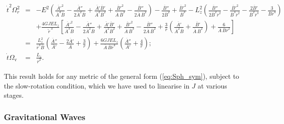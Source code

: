 \documentclass[aps,prd,amsfonts,amssymb,amsmath,nofootinbib,reprint,showpacs]{revtex4-1}
\newcommand{\eqnref}[1]{(\ref{eq:#1})}
\newcommand{\sub}[1]{\ensuremath{_\text{#1}}}
\begin{document}
\begin{widetext}
\begin{eqnarray}
\dot{t}^2\Omega^2_r & = & -E^2 \left( \frac{\overline{A}'^2}{\overline{A}^3 \overline{B}} - \frac{\overline{A}''}{2\overline{A}^2\overline{B}} + \frac{\overline{A}'\overline{B}'}{\overline{A}^2\overline{B}^2} + \frac{\overline{B}'^2}{\overline{A}\,\overline{B}^3} - \frac{\overline{B}''}{2\overline{A}\,\overline{B}^2} \right) - \frac{\overline{B}''}{2\overline{B}^2} +  \frac{\overline{B}'^2}{\overline{B}^3} - L_z^2 \left(\frac{\overline{B}''}{2\overline{B}^2 \overline{r}^2} - \frac{\overline{B}'^2}{\overline{B}^3 \overline{r}^2} - \frac{2\overline{B}'}{\overline{B}^2 \overline{r}^3}-\frac{3}{\overline{B} \overline{r}^4} \right) \nonumber\\
& & + \frac{4GJEL_z}{\widetilde{r}^{\,3}} \left[ \frac{\overline{A}'^2}{\overline{A}^3 \overline{B}} - \frac{\overline{A}''}{2\overline{A}^2\overline{B}} + \frac{\overline{A}'\overline{B}'}{\overline{A}^2\overline{B}^2} + \frac{\overline{B}'^2}{\overline{A}\,\overline{B}^3} - \frac{\overline{B}''}{2\overline{A}\,\overline{B}^2} +\frac{3}{\overline{r}}\left(\frac{\overline{A}'}{\overline{A}^2\overline{B}}+\frac{\overline{B}'}{\overline{A}\,\overline{B}^2}\right) +\frac{6}{\overline{A}\,\overline{B}\overline{r}^2}\right] \nonumber \\
& = &  \frac{L_z^2}{\overline{r}^3\overline{B}}\left(\frac{\overline{A}''}{\overline{A}'} - \frac{2\overline{A}'}{\overline{A}} + \frac{3}{\overline{r}}\right) +\frac{6GJEL_z}{\overline{A}\,\overline{B} \overline{r}^4} \left(\frac{\overline{A}''}{\overline{A}'} + \frac{4}{\overline{r}}\right); \\
\dot{t}\Omega\sub{v} & = & \frac{L_z}{\overline{r}^2}.
\end{eqnarray}
\end{widetext}
This result holds for any metric of the general form \eqnref{Sph_sym}, subject to the slow-rotation condition, which we have used to linearise in $J$ at various stages.

\subsubsection{Gravitational Waves}
\end{document}
